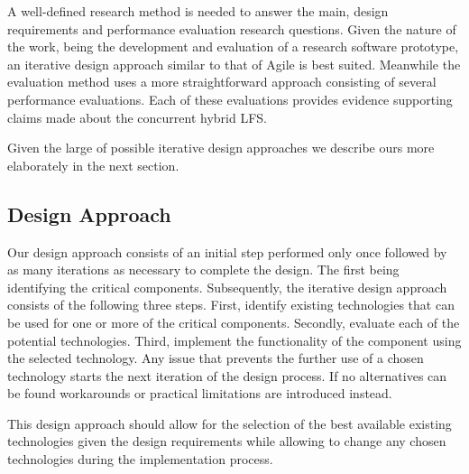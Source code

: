 A well-defined research method is needed to answer the main, design requirements
and performance evaluation research questions. Given the nature of the work,
being the development and evaluation of a research software prototype, an
iterative design approach similar to that of Agile is best suited. Meanwhile the
evaluation method uses a more straightforward approach consisting of several
performance evaluations. Each of these evaluations provides evidence supporting
claims made about the concurrent hybrid LFS.

Given the large of possible iterative design approaches we describe ours
more elaborately in the next section.

\subsection{Design Approach}

Our design approach consists of an initial step performed only once followed by
as many iterations as necessary to complete the design. The first being
identifying the critical components. Subsequently, the iterative design approach
consists of the following three steps. First, identify existing technologies
that can be used for one or more of the critical components. Secondly,
evaluate each of the potential technologies. Third, implement the
functionality of the component using the selected technology. Any issue that
prevents the further use of a chosen technology starts the next iteration of the
design process. If no alternatives can be found workarounds or practical
limitations are introduced instead.

This design approach should allow for the selection of the best available
existing technologies given the design requirements while allowing to change
any chosen technologies during the implementation process.
